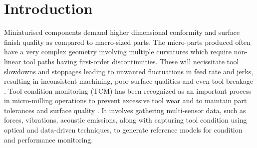 \documentclass[preprint,review,12pt]{elsarticle}
\begin{document}

\section{Introduction}\label{chap:intro}

Miniaturised components demand higher dimensional conformity and surface finish quality as compared to macro-sized parts. The micro-parts produced often have a very complex geometry involving multiple curvatures which require non-linear tool paths having first-order discontinuities. These will necissitate tool slowdowns and stoppages leading to unwanted fluctuations in feed rate and jerks, resulting in inconsistent machining, poor surface qualities and even tool breakage \cite{CITE1}. Tool condition monitoring (TCM) has been recognized as an important process in micro-milling operations to prevent excessive tool wear and to maintain part tolerances and surface quality \cite{CITE2}. It involves gathering multi-sensor data, such as forces, vibrations, acoustic emissions, along with capturing tool condition using optical and data-driven techniques, to generate reference models for condition and performance monitoring. \par
\end{document}
